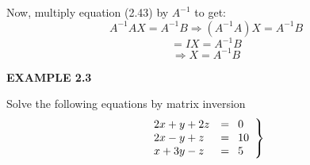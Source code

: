 \documentclass[a4paper, 12pt]{report}
\begin{document}
{      Now, multiply equation (2.43) by $A^{-1}$ to get:
      \begin{equation*}
      A^{-1} AX= A^{-1}B \Rightarrow (A^{-1}A)X= A^{-1}B
      \end{equation*}
      \begin{equation*}
      = IX= A^{-1}B
      \end{equation*}
      \begin{equation}
      \Rightarrow X= A^{-1}B
      \end{equation} 
      \newpage
      \begin{center}
      	\textbf{EXAMPLE 2.3}
      \end{center}
      Solve the following equations by matrix inversion
      \begin{equation}
          	\left.\begin{array}{lp{0.2cm}l}
          		2x + y + 2z&=&0\\
          		2x - y + z &=&10\\
          		x + 3y - z &=&5
          	\end{array}\right\}
          	\end{equation}

}
\end{document}
